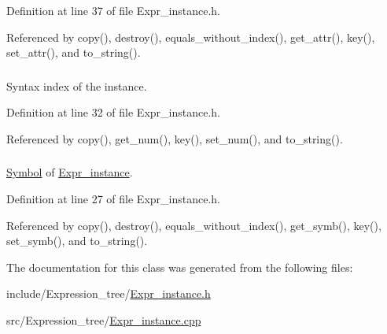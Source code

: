 Definition at line 37 of file Expr\_\-instance.h.

Referenced by copy(), destroy(), equals\_\-without\_\-index(), get\_\-attr(), key(), set\_\-attr(), and to\_\-string().\hypertarget{classgenevalmag_1_1Expr__instance_f8d85fabc65cf8133ed5b1f7a6fa925b}{
\subsubsection[{i\_\-num}]{}}
\label{classgenevalmag_1_1Expr__instance_f8d85fabc65cf8133ed5b1f7a6fa925b}


Syntax index of the instance. 



Definition at line 32 of file Expr\_\-instance.h.

Referenced by copy(), get\_\-num(), key(), set\_\-num(), and to\_\-string().\hypertarget{classgenevalmag_1_1Expr__instance_c95a446e179a79d7919c4db67b66b7f0}{
\subsubsection[{i\_\-symb}]{}}
\label{classgenevalmag_1_1Expr__instance_c95a446e179a79d7919c4db67b66b7f0}


\hyperlink{classgenevalmag_1_1Symbol}{Symbol} of \hyperlink{classgenevalmag_1_1Expr__instance}{Expr\_\-instance}. 



Definition at line 27 of file Expr\_\-instance.h.

Referenced by copy(), destroy(), equals\_\-without\_\-index(), get\_\-symb(), key(), set\_\-symb(), and to\_\-string().

The documentation for this class was generated from the following files:\begin{CompactItemize}
\item 
include/Expression\_\-tree/\hyperlink{Expr__instance_8h}{Expr\_\-instance.h}\item 
src/Expression\_\-tree/\hyperlink{Expr__instance_8cpp}{Expr\_\-instance.cpp}\end{CompactItemize}
